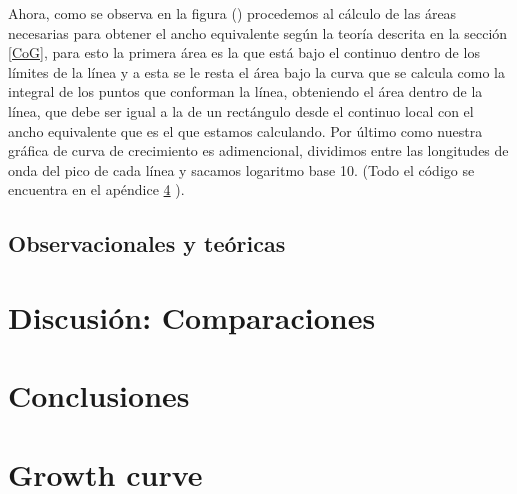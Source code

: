 \documentclass[12pt,oneside,openany,letter]{book}
\begin{document}
Ahora, como se observa en la figura () procedemos al cálculo de las áreas necesarias para obtener el ancho equivalente según la teoría descrita en la sección \ref{CoG}, para esto la primera área es la que está bajo el continuo dentro de los límites de la línea y a esta se le resta el área bajo la curva que se calcula como la integral de los puntos que conforman la línea, obteniendo el área dentro de la línea, que debe ser igual a la de un rectángulo desde el continuo local con el ancho equivalente que es el que estamos calculando. Por último como nuestra gráfica de curva de crecimiento es adimencional, dividimos entre las longitudes de onda del pico de cada línea y sacamos logaritmo base 10. (Todo el código se encuentra en el apéndice \ref{apendiceCoG} ).


\section{Observacionales y teóricas}

\chapter{Discusión: Comparaciones}\label{cap5}



\chapter{Conclusiones}\label{cap6}

\appendix
\chapter{Growth curve}\label{apendiceCoG}




\end{document}
